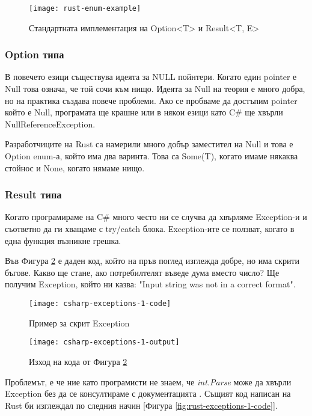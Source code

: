 \begin{figure}[!htb]
  \texttt{[image: rust-enum-example]}
  \centering
  \caption{Стандартната имплементация на Option<T> и Result<T, E>}
  \label{fig:rust-enum-example}
\end{figure}

\subsubsection{Option типа}
В повечето езици съществува идеята за NULL пойнтери. Когато един pointer е Null
това означа, че той сочи към нищо. Идеята за Null на теория е много добра, но
на практика създава повече проблеми. Ако се пробваме да достъпим pointer който
е Null, програмата ще крашне или в някои езици като C\# ще хвърли
NullReferenceException.

Разработчиците на Rust са намерили много добър заместител на Null и това е
Option enum-а, който има два варинта. Това са Some(T), когато имаме някаква
стойнос и None, когато нямаме нищо.

\subsubsection{Result типа}
Когато програмираме на C\# много често ни се случва да хвърляме Exception-и и
съответно да ги хващаме с try/catch блока. Еxception-ите се ползват, когато в
една функция възникне грешка.

Във Фигура \ref{fig:csharp-exceptions-1-code} е даден код, който на пръв поглед
изглежда добре, но има скрити бъгове. Какво ще стане, ако потребилтелят въведе
дума вместо число? Ще получим Exception, който ни казва: "Input string was not
in a correct format".
\begin{figure}[!htb]
  \texttt{[image: csharp-exceptions-1-code]}
  \centering
  \caption{Пример за скрит Exception}
  \label{fig:csharp-exceptions-1-code}
\end{figure}


\begin{figure}[!htb]
  \texttt{[image: csharp-exceptions-1-output]}
  \centering
  \caption{Изход на кода от Фигура \ref{fig:csharp-exceptions-1-code}}
  \label{fig:csharp-exceptions-1-output}
\end{figure}

\newpage
Проблемът, е че ние като програмисти не знаем, че \textit{int.Parse} може да хвърли
Exception без да се консултираме с документацията \cite{CSharp_Int_Parse}.
Същият код написан на Rust би изглеждал по следния начин [Фигура \ref{fig:rust-exceptions-1-code}].

